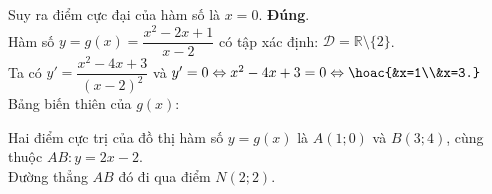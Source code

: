\begin{ex}
{\begin{itemchoice}
\begin{center}
\end{center}
Suy ra điểm cực đại của hàm số là $x=0$.
\itemch \textbf{Đúng}.\\
Hàm số $y=g(x)=\dfrac{x^2-2x+1}{x-2}$ có tập xác định: $\mathscr{D}=\mathbb{R} \setminus \big\{2\big\}$.\\
Ta có $y'=\dfrac{x^2-4x+3}{(x-2)^2}$ và $y'=0 \Leftrightarrow x^2-4x+3=0 \Leftrightarrow \hoac{&x=1\\&x=3.}$\\
Bảng biến thiên của $g(x)$:
\begin{center}
\end{center}
Hai điểm cực trị của đồ thị hàm số $y=g(x)$ là $A(1;0)$ và $B(3;4)$, cùng thuộc $AB\colon y=2x-2$.\\
Đường thẳng $AB$ đó đi qua điểm $N(2;2)$.
\end{itemchoice}
}
\end{ex}

